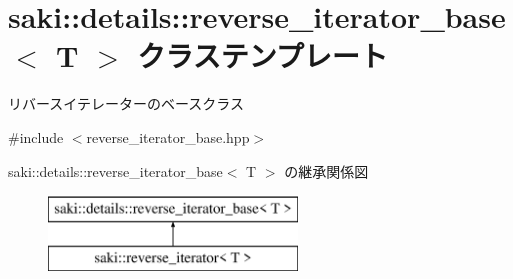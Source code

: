 \hypertarget{classsaki_1_1details_1_1reverse__iterator__base}{}\section{saki\+:\+:details\+:\+:reverse\+\_\+iterator\+\_\+base$<$ T $>$ クラステンプレート}
\label{classsaki_1_1details_1_1reverse__iterator__base}


リバースイテレーターのベースクラス  




{\ttfamily \#include $<$reverse\+\_\+iterator\+\_\+base.\+hpp$>$}

saki\+:\+:details\+:\+:reverse\+\_\+iterator\+\_\+base$<$ T $>$ の継承関係図\begin{figure}[H]
\begin{center}
\leavevmode
\includegraphics[height=2.000000cm]{classsaki_1_1details_1_1reverse__iterator__base}
\end{center}
\end{figure}
